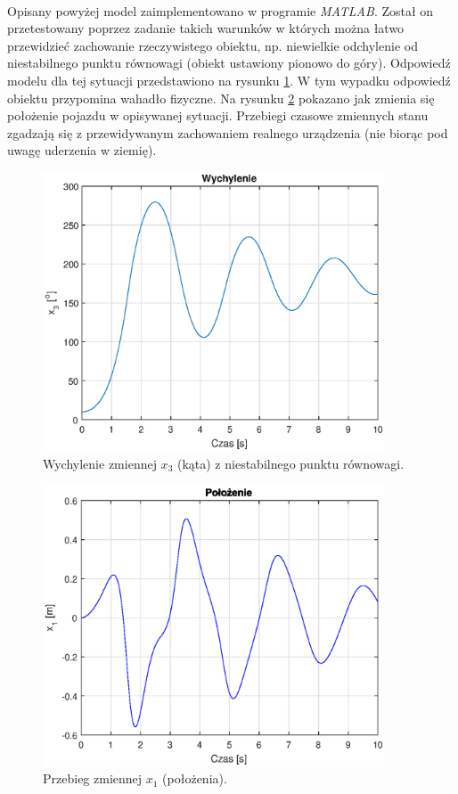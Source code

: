 \paragraph*{}
Opisany powyżej model zaimplementowano w programie \textit{MATLAB}. Został on przetestowany poprzez zadanie takich warunków w których można łatwo przewidzieć zachowanie rzeczywistego obiektu, np. niewielkie odchylenie od niestabilnego punktu równowagi (obiekt ustawiony pionowo do góry). Odpowiedź modelu dla tej sytuacji przedstawiono na rysunku \ref{fig:wychylenie_test}. W tym wypadku odpowiedź obiektu przypomina wahadło fizyczne. Na rysunku \ref{fig:polozenie_test} pokazano jak zmienia się położenie pojazdu w opisywanej sytuacji. Przebiegi czasowe zmiennych stanu zgadzają się z przewidywanym zachowaniem realnego urządzenia (nie biorąc pod uwagę uderzenia w ziemię).

\begin{figure}[h]
	\centering
	\includegraphics[width=4in]{Figures/wychylenie_test.eps}
	\caption{Wychylenie zmiennej \(x_3\) (kąta) z niestabilnego punktu równowagi.}
	\label{fig:wychylenie_test}
\end{figure}

\begin{figure}[H]
	\centering
	\includegraphics[width=4in]{Figures/polozenie_test.eps}
	\caption{Przebieg zmiennej \(x_1\) (położenia).}
	\label{fig:polozenie_test}
\end{figure}

